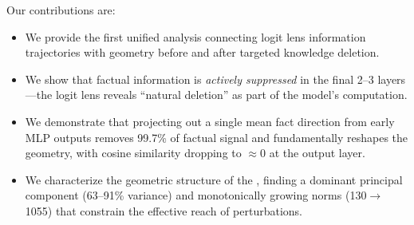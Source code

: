Our contributions are:
\begin{itemize}[leftmargin=*,itemsep=0pt,topsep=0pt]
    \item We provide the first unified analysis connecting logit lens information trajectories with \residstream geometry before and after targeted knowledge deletion.
    \item We show that factual information is \emph{actively suppressed} in the final 2--3 layers---the logit lens reveals ``natural deletion'' as part of the model's computation.
    \item We demonstrate that projecting out a single mean fact direction from early MLP outputs removes 99.7\% of factual signal and fundamentally reshapes the \residstream geometry, with cosine similarity dropping to $\approx 0$ at the output layer.
    \item We characterize the geometric structure of the \residstream, finding a dominant principal component (63--91\% variance) and monotonically growing norms (130$\to$1055) that constrain the effective reach of perturbations.
\end{itemize}
